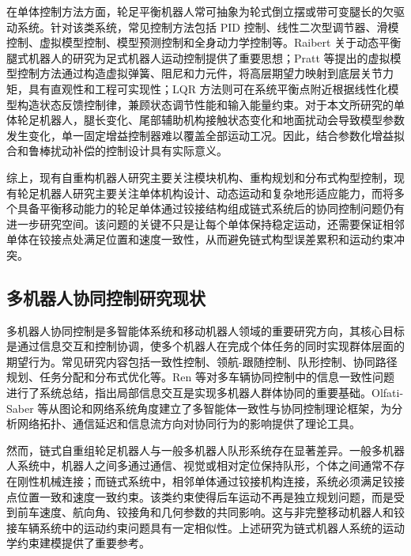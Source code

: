 \documentclass[type=bachelor]{bithesis}
\begin{document}
在单体控制方法方面，轮足平衡机器人常可抽象为轮式倒立摆或带可变腿长的欠驱动系统。针对该类系统，常见控制方法包括 PID 控制、线性二次型调节器、滑模控制、虚拟模型控制、模型预测控制和全身动力学控制等。Raibert 关于动态平衡腿式机器人的研究为足式机器人运动控制提供了重要思想\cite{raibert1986legged}；Pratt 等提出的虚拟模型控制方法通过构造虚拟弹簧、阻尼和力元件，将高层期望力映射到底层关节力矩，具有直观性和工程可实现性\cite{pratt2001virtual}；LQR 方法则可在系统平衡点附近根据线性化模型构造状态反馈控制律，兼顾状态调节性能和输入能量约束\cite{anderson1990optimal,kirk1970optimal}。对于本文所研究的单体轮足机器人，腿长变化、尾部辅助机构接触状态变化和地面扰动会导致模型参数发生变化，单一固定增益控制器难以覆盖全部运动工况。因此，结合参数化增益拟合和鲁棒扰动补偿的控制设计具有实际意义。

综上，现有自重构机器人研究主要关注模块机构、重构规划和分布式构型控制，现有轮足机器人研究主要关注单体机构设计、动态运动和复杂地形适应能力，而将多个具备平衡移动能力的轮足单体通过铰接结构组成链式系统后的协同控制问题仍有进一步研究空间。该问题的关键不只是让每个单体保持稳定运动，还需要保证相邻单体在铰接点处满足位置和速度一致性，从而避免链式构型误差累积和运动约束冲突。

\subsection{多机器人协同控制研究现状}
多机器人协同控制是多智能体系统和移动机器人领域的重要研究方向，其核心目标是通过信息交互和控制协调，使多个机器人在完成个体任务的同时实现群体层面的期望行为。常见研究内容包括一致性控制、领航-跟随控制、队形控制、协同路径规划、任务分配和分布式优化等\cite{ren2007information,olfati2007consensus,ren2008distributed,liu2018survey}。Ren 等对多车辆协同控制中的信息一致性问题进行了系统总结，指出局部信息交互是实现多机器人群体协同的重要基础\cite{ren2007information}。Olfati-Saber 等从图论和网络系统角度建立了多智能体一致性与协同控制理论框架，为分析网络拓扑、通信延迟和信息流方向对协同行为的影响提供了理论工具\cite{olfati2007consensus}。

然而，链式自重组轮足机器人与一般多机器人队形系统存在显著差异。一般多机器人系统中，机器人之间多通过通信、视觉或相对定位保持队形，个体之间通常不存在刚性机械连接；而链式系统中，相邻单体通过铰接机构连接，系统必须满足铰接点位置一致和速度一致约束。该类约束使得后车运动不再是独立规划问题，而是受到前车速度、航向角、铰接角和几何参数的共同影响。这与非完整移动机器人和铰接车辆系统中的运动约束问题具有一定相似性\cite{murray1993nonholonomic,campion1996structural,laumond1998robot,lamiraux2001smooth}。上述研究为链式机器人系统的运动学约束建模提供了重要参考。
\end{document}
